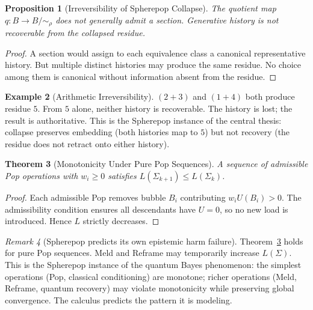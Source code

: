 \documentclass[12pt,oneside]{book}
\theoremstyle{plain}
\newtheorem{theorem}{Theorem}[chapter]
\newtheorem{proposition}[theorem]{Proposition}
\theoremstyle{definition}
\newtheorem{example}[theorem]{Example}
\theoremstyle{remark}
\newtheorem{remark}[theorem]{Remark}
\begin{document}
\begin{proposition}[Irreversibility of Spherepop Collapse]
\label{prop:spherepop-irrev}
The quotient map $q : B \to B/{\sim_\rho}$ does not generally admit a section.
Generative history is not recoverable from the collapsed residue.
\end{proposition}

\begin{proof}
A section would assign to each equivalence class a canonical representative
history. But multiple distinct histories may produce the same residue.
No choice among them is canonical without information absent from the residue.
\end{proof}

\begin{example}[Arithmetic Irreversibility]
$(2+3)$ and $(1+4)$ both produce residue $5$. From $5$ alone, neither history
is recoverable. The history is lost; the result is authoritative. This is
the Spherepop instance of the central thesis: collapse preserves embedding
(both histories map to $5$) but not recovery (the residue does not retract
onto either history).
\end{example}

\begin{theorem}[Monotonicity Under Pure Pop Sequences]
\label{thm:pop-monotone}
A sequence of admissible Pop operations with $w_i \geq 0$ satisfies
$L(\Sigma_{k+1}) \leq L(\Sigma_k)$.
\end{theorem}

\begin{proof}
Each admissible Pop removes bubble $B_i$ contributing $w_i U(B_i) > 0$.
The admissibility condition ensures all descendants have $U = 0$, so no
new load is introduced. Hence $L$ strictly decreases.
\end{proof}

\begin{remark}[Spherepop predicts its own epistemic harm failure]
Theorem~\ref{thm:pop-monotone} holds for pure Pop sequences. Meld and
Reframe may temporarily increase $L(\Sigma)$. This is the Spherepop instance
of the quantum Bayes phenomenon: the simplest operations (Pop, classical
conditioning) are monotone; richer operations (Meld, Reframe, quantum
recovery) may violate monotonicity while preserving global convergence.
The calculus predicts the pattern it is modeling.
\end{remark}
\end{document}
